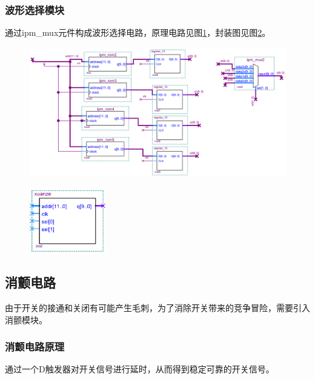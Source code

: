 \documentclass[12pt]{article}
\begin{document}
\subsubsection{波形选择模块}
通过ipm\_mux元件构成波形选择电路，原理电路见图\ref{fig:xuanze}，封装图见图\ref{fig:fengzhuangxuanze}。
\begin{figure}[hp]
	\centering  
	\includegraphics[width=\textwidth]{picture/xuanze.png} 
	\caption{}
	\label{fig:xuanze}   
\end{figure}
\begin{figure}[hp]
	\centering  
	\includegraphics[width=0.3\textwidth]{picture/xuanzefz.png} 
	\caption{}
	\label{fig:fengzhuangxuanze}   
\end{figure}
\subsection{消颤电路}
由于开关的接通和关闭有可能产生毛刺，为了消除开关带来的竞争冒险，需要引入消颤模块。
\subsubsection{消颤电路原理}
通过一个D触发器对开关信号进行延时，从而得到稳定可靠的开关信号。
\end{document}
